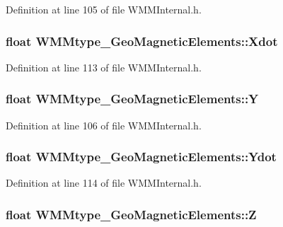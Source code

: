 Definition at line 105 of file W\-M\-M\-Internal.\-h.

\hypertarget{struct_w_m_mtype___geo_magnetic_elements_a58fb30f1b03a7cace00a55fb28f6752f}{
\subsubsection[{Xdot}]{\setlength{\rightskip}{0pt plus 5cm}float W\-M\-Mtype\-\_\-\-Geo\-Magnetic\-Elements\-::\-Xdot}}\label{struct_w_m_mtype___geo_magnetic_elements_a58fb30f1b03a7cace00a55fb28f6752f}


Definition at line 113 of file W\-M\-M\-Internal.\-h.

\hypertarget{struct_w_m_mtype___geo_magnetic_elements_af6f78344def47740cd5ce0196189ce32}{
\subsubsection[{Y}]{\setlength{\rightskip}{0pt plus 5cm}float W\-M\-Mtype\-\_\-\-Geo\-Magnetic\-Elements\-::\-Y}}\label{struct_w_m_mtype___geo_magnetic_elements_af6f78344def47740cd5ce0196189ce32}


Definition at line 106 of file W\-M\-M\-Internal.\-h.

\hypertarget{struct_w_m_mtype___geo_magnetic_elements_a2290a6a91702f831acd13dc8433c816a}{
\subsubsection[{Ydot}]{\setlength{\rightskip}{0pt plus 5cm}float W\-M\-Mtype\-\_\-\-Geo\-Magnetic\-Elements\-::\-Ydot}}\label{struct_w_m_mtype___geo_magnetic_elements_a2290a6a91702f831acd13dc8433c816a}


Definition at line 114 of file W\-M\-M\-Internal.\-h.

\hypertarget{struct_w_m_mtype___geo_magnetic_elements_adb133f24b128e0dcd3ad2b219d2c42e5}{
\subsubsection[{Z}]{\setlength{\rightskip}{0pt plus 5cm}float W\-M\-Mtype\-\_\-\-Geo\-Magnetic\-Elements\-::\-Z}}\label{struct_w_m_mtype___geo_magnetic_elements_adb133f24b128e0dcd3ad2b219d2c42e5}


